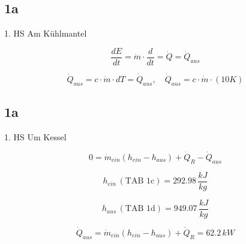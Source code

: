 

\subsection*{1a}
1. HS Am Kühlmantel

\[
\frac{dE}{dt} = \dot{m} \cdot \frac{d}{dt} = \dot{Q} = \dot{Q}_{aus}
\]

\[
\dot{Q}_{aus} = c \cdot \dot{m} \cdot dT = \dot{Q}_{aus}, \quad \dot{Q}_{aus} = c \cdot \dot{m} \cdot (10K)
\]



\subsection*{1a}
1. HS Um Kessel

\[
0 = \dot{m}_{ein}(h_{ein} - h_{aus}) + \dot{Q}_R - \dot{Q}_{aus}
\]

\[
h_{ein} \, (\text{TAB 1c}) = 292.98 \, \frac{kJ}{kg}
\]

\[
h_{aus} \, (\text{TAB 1d}) = 949.07 \, \frac{kJ}{kg}
\]

\[
\dot{Q}_{aus} = \dot{m}_{ein}(h_{ein} - h_{aus}) + \dot{Q}_R = 62.2 \, kW
\]